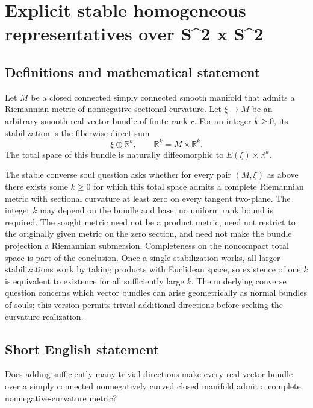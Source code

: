 \documentclass[11pt,a4paper]{article}
\begin{document}
\section*{Explicit stable homogeneous representatives over S\textasciicircum{}2 x S\textasciicircum{}2}\label{statement}

\subsection{Definitions and mathematical statement}
Let $M$ be a closed connected simply connected smooth manifold that admits a Riemannian metric of nonnegative sectional curvature.
Let $\xi\to M$ be an arbitrary smooth real vector bundle of finite rank $r$.
For an integer $k\geq0$, its stabilization is the fiberwise direct sum
\[
 \xi\oplus\underline{\mathbb R}^{k},
 \qquad \underline{\mathbb R}^{k}=M\times\mathbb R^k.
\]
The total space of this bundle is naturally diffeomorphic to $E(\xi)\times\mathbb R^k$.

The stable converse soul question asks whether for every pair $(M,\xi)$ as above there exists some $k\geq0$ for which this total space admits a complete Riemannian metric with sectional curvature at least zero on every tangent two-plane.
The integer $k$ may depend on the bundle and base; no uniform rank bound is required.
The sought metric need not be a product metric, need not restrict to the originally given metric on the zero section, and need not make the bundle projection a Riemannian submersion.
Completeness on the noncompact total space is part of the conclusion.
Once a single stabilization works, all larger stabilizations work by taking products with Euclidean space, so existence of one $k$ is equivalent to existence for all sufficiently large $k$.
The underlying converse question concerns which vector bundles can arise geometrically as normal bundles of souls; this version permits trivial additional directions before seeking the curvature realization.
\subsection{Short English statement}
Does adding sufficiently many trivial directions make every real vector bundle over a simply connected nonnegatively curved closed manifold admit a complete nonnegative-curvature metric?
\end{document}
